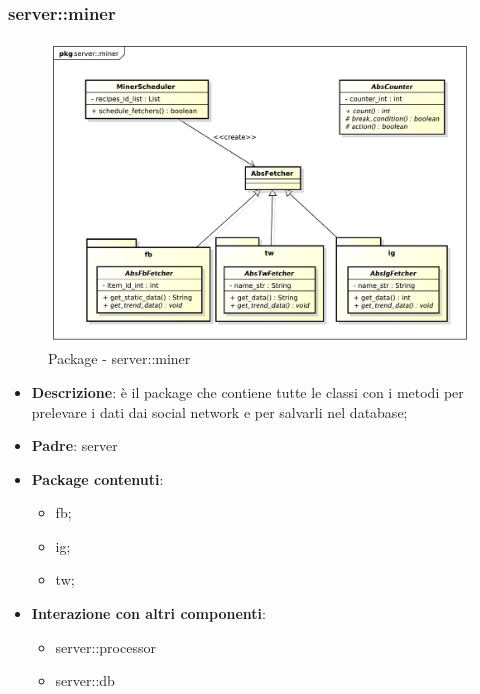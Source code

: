 


\subsubsection{server::miner} %
\label{ssub:bdsm_app_server_miner}
\begin{figure}[htbp]
	\centering
	\centerline{\includegraphics[scale=0.4]{./images/server/miner.pdf}}
	\caption{Package - server::miner}
\end{figure}

\begin{itemize}
  \item \textbf{Descrizione}: è il package che contiene tutte le classi con i metodi per prelevare i dati dai social network e per salvarli nel database;
  \item \textbf{Padre}: server
  \item \textbf{Package contenuti}:
  	\begin{itemize}
  		\item fb;
  		\item ig;
  		\item tw;
  	\end{itemize}
  \item \textbf{Interazione con altri componenti}:
  	\begin{itemize}
  		\item server::processor
  		\item server::db
  	\end{itemize}
\end{itemize}

